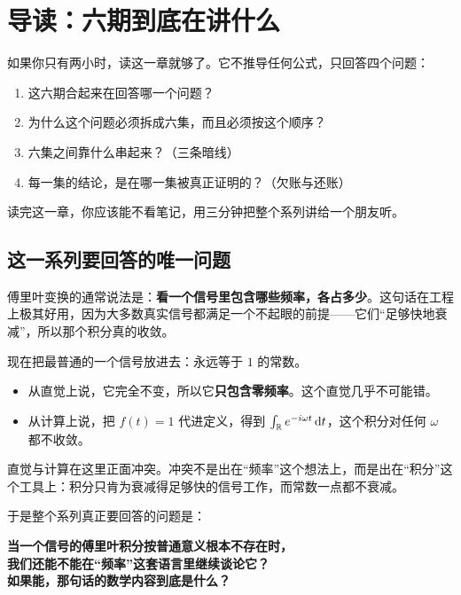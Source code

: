 \chapter{导读：六期到底在讲什么}

\begin{ideabox}[这一章的作用]
如果你只有两小时，读这一章就够了。它不推导任何公式，只回答四个问题：
\begin{enumerate}[leftmargin=1.6em,itemsep=0.2em,topsep=0.2em]
\item 这六期合起来在回答哪一个问题？
\item 为什么这个问题必须拆成六集，而且必须按这个顺序？
\item 六集之间靠什么串起来？（三条暗线）
\item 每一集的结论，是在哪一集被真正证明的？（欠账与还账）
\end{enumerate}
读完这一章，你应该能不看笔记，用三分钟把整个系列讲给一个朋友听。
\end{ideabox}

\section{这一系列要回答的唯一问题}

傅里叶变换的通常说法是：\textbf{看一个信号里包含哪些频率，各占多少}。这句话在工程上极其好用，因为大多数真实信号都满足一个不起眼的前提——它们“足够快地衰减”，所以那个积分真的收敛。

现在把最普通的一个信号放进去：永远等于 $1$ 的常数。

\begin{itemize}[leftmargin=1.6em,itemsep=0.3em]
\item 从直觉上说，它完全不变，所以它\textbf{只包含零频率}。这个直觉几乎不可能错。
\item 从计算上说，把 $f(t)=1$ 代进定义，得到 $\int_{\mathbb{R}}e^{-i\omega t}\mathop{}\!\mathrm{d} t$，这个积分对任何 $\omega$ 都不收敛。
\end{itemize}

直觉与计算在这里正面冲突。冲突不是出在“频率”这个想法上，而是出在“积分”这个工具上：积分只肯为衰减得足够快的信号工作，而常数一点都不衰减。

于是整个系列真正要回答的问题是：

\begin{center}
\begin{tcolorbox}[colback=softblue,colframe=mainblue!50,boxrule=0pt,arc=2pt,width=0.93\textwidth]
\centering
\textbf{当一个信号的傅里叶积分按普通意义根本不存在时，\\[0.25em]
我们还能不能在“频率”这套语言里继续谈论它？\\[0.25em]
如果能，那句话的数学内容到底是什么？}
\end{tcolorbox}
\end{center}

